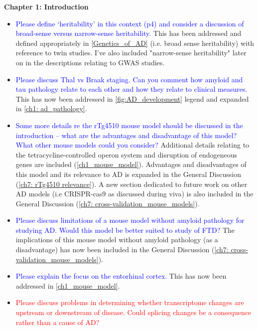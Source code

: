 \documentclass[a4paper,12pt,oneside]{report}
\begin{document}
\textbf{Chapter 1: Introduction}
\begin{itemize}
	\item \textcolor{blue}{Please define ‘heritability’ in this context (p4) and consider a discussion of broad-sense versus narrow-sense heritability.} 
	This has been addressed and defined appropriately in \cref{Genetics_of_AD} (i.e. broad sense heritability) with reference to twin studies. I've also included "narrow-sense heritability" later on in the descriptions relating to GWAS studies.	
	\item \textcolor{blue}{Please discuss Thal vs Braak staging. Can you comment how amyloid and tau pathology relate to each other and how they relate to clinical measures.}
	This has now been addressed in \cref{fig:AD_development} legend and expanded in \cref{ch1: ad_pathology}.
	\item \textcolor{blue}{Some more details re the rTg4510 mouse model should be discussed in the introduction – what are the advantages and disadvantage of this model? What other mouse models could you consider?} 
	\newline Additional details relating to the tetracycline-controlled operon system and disruption of endogeneous genes are included (\cref{ch1_mouse_model}).
	\newline Advantages and disadvantages of this model and its relevance to AD is expanded in the General Discussion (\cref{ch7: rTg4510 relevance}). A new section dedicated to future work on other AD models (i.e CRISPR-cas9 as discussed during viva) is also included in the General Discussion (\cref{ch7: cross-validation_mouse_models}).  
	\item \textcolor{blue}{Please discuss limitations of a mouse model without amyloid pathology for studying AD. Would this model be better suited to study of FTD?} 
	\newline The implications of this mouse model without amyloid pathology (as a disadvantage) has now been included in the General Discussion (\cref{ch7: cross-validation_mouse_models}).
	\item \textcolor{blue}{Please explain the focus on the entorhinal cortex.} 
	\newline This has now been addressed in \cref{ch1_mouse_model}.
	\item \textcolor{red}{Please discuss problems in determining whether transcriptome changes are upstream or downstream of disease. Could splicing changes be a consequence rather than a cause of AD?}
\end{itemize}
\end{document}

